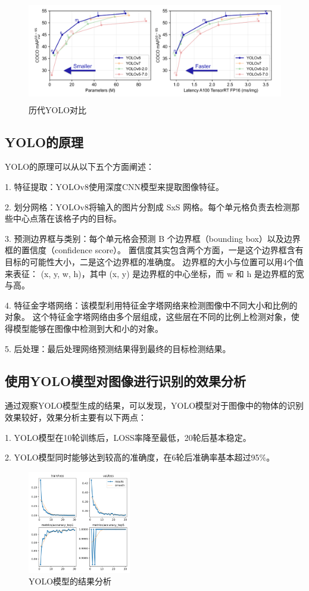 \begin{figure}[H]
    \centering %
    \includegraphics[height=4.5cm]{../../YOLO/pics/img.png}
    \caption{历代YOLO对比}
\end{figure}

\subsection{YOLO的原理}

YOLO的原理可以从以下五个方面阐述：\par
1. 特征提取：YOLOv8使用深度CNN模型来提取图像特征。\par
2. 划分网格：YOLOv8将输入的图片分割成 SxS 网格。每个单元格负责去检测那些中心点落在该格子内的目标。\par
3. 预测边界框与类别：每个单元格会预测 B 个边界框（bounding box）以及边界框的置信度（confidence score）。
置信度其实包含两个方面，一是这个边界框含有目标的可能性大小，二是这个边界框的准确度。
边界框的大小与位置可以用4个值来表征： (x, y, w, h)，其中 (x, y) 是边界框的中心坐标，而 w 和 h 是边界框的宽与高。\par
4. 特征金字塔网络：该模型利用特征金字塔网络来检测图像中不同大小和比例的对象。
这个特征金字塔网络由多个层组成，这些层在不同的比例上检测对象，使得模型能够在图像中检测到大和小的对象。\par
5. 后处理：最后处理网络预测结果得到最终的目标检测结果。\par


\subsection{使用YOLO模型对图像进行识别的效果分析}

通过观察YOLO模型生成的结果，可以发现，YOLO模型对于图像中的物体的识别效果较好，效果分析主要有以下两点：\par
1. YOLO模型在10轮训练后，LOSS率降至最低，20轮后基本稳定。\par
2. YOLO模型同时能够达到较高的准确度，在6轮后准确率基本超过95$\%$。\par

\begin{figure}[H]
    \centering %
    \includegraphics[height=4.5cm]{../../YOLO/runs/classify/train2/results.png}
    \caption{YOLO模型的结果分析}
\end{figure}